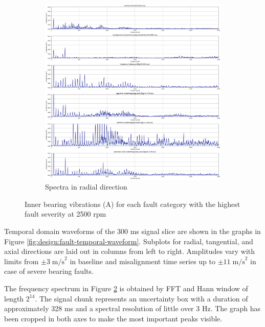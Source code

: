 \begin{figure}[ht]
\begin{subfigure}[b]{0.44\textwidth}
    \end{subfigure}
    \hfill
    \begin{subfigure}[b]{0.55\textwidth}
        \includegraphics[width=\textwidth]{assets/design/Mafaulda-A-spectrum-Y-axis.png}
        \caption{Spectra in radial direction}
        \label{fig:design:fault-spectral-waveform}
    \end{subfigure} 
    \caption{Inner bearing vibrations (A) for each fault category with the highest fault severity at 2500 rpm}
\end{figure}

Temporal domain waveforms of the 300 ms signal slice are shown in the graphs in Figure \ref{fig:design:fault-temporal-waveform}. Subplots for radial, tangential, and axial directions are laid out in columns from left to right. Amplitudes vary with limits from $\pm 3\; \mathrm{m/s}^2$ in baseline and misalignment time series up to $\pm 11\;\mathrm{m/s}^2$ in case of severe bearing faults. 

The frequency spectrum in Figure \ref{fig:design:fault-spectral-waveform} is obtained by FFT and Hann window of length $2^{14}$. The signal chunk represents an uncertainty box with a duration of approximately 328 ms and a spectral resolution of little over 3 Hz. The graph has been cropped in both axes to make the most important peaks visible.


